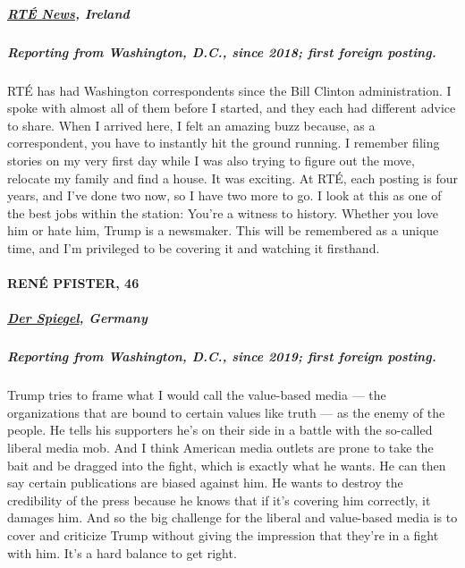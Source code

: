 \hypertarget{rtuxe9-news-ireland}{%
\subparagraph{\texorpdfstring{\textbf{\href{https://www.rte.ie/news/}{RTÉ
News}, Ireland}}{RTÉ News, Ireland}}\label{rtuxe9-news-ireland}}

\hypertarget{reporting-from-washington-dc-since-2018-first-foreign-posting-1}{%
\subparagraph{\texorpdfstring{\textbf{Reporting from Washington, D.C.,
since 2018; first foreign
posting.}}{Reporting from Washington, D.C., since 2018; first foreign posting.}}\label{reporting-from-washington-dc-since-2018-first-foreign-posting-1}}

RTÉ has had Washington correspondents since the Bill Clinton
administration. I spoke with almost all of them before I started, and
they each had different advice to share. When I arrived here, I felt an
amazing buzz because, as a correspondent, you have to instantly hit the
ground running. I remember filing stories on my very first day while I
was also trying to figure out the move, relocate my family and find a
house. It was exciting. At RTÉ, each posting is four years, and I've
done two now, so I have two more to go. I look at this as one of the
best jobs within the station: You're a witness to history. Whether you
love him or hate him, Trump is a newsmaker. This will be remembered as a
unique time, and I'm privileged to be covering it and watching it
firsthand.

\hypertarget{renuxe9-pfister-46}{%
\paragraph{RENÉ PFISTER, 46}\label{renuxe9-pfister-46}}

\hypertarget{der-spiegel-germany}{%
\subparagraph{\texorpdfstring{\textbf{\href{https://www.spiegel.de/}{Der
Spiegel}, Germany}}{Der Spiegel, Germany}}\label{der-spiegel-germany}}

\hypertarget{reporting-from-washington-dc-since-2019-first-foreign-posting-1}{%
\subparagraph{\texorpdfstring{\textbf{Reporting from Washington, D.C.,
since 2019; first foreign
posting.}}{Reporting from Washington, D.C., since 2019; first foreign posting.}}\label{reporting-from-washington-dc-since-2019-first-foreign-posting-1}}

Trump tries to frame what I would call the value-based media --- the
organizations that are bound to certain values like truth --- as the
enemy of the people. He tells his supporters he's on their side in a
battle with the so-called liberal media mob. And I think American media
outlets are prone to take the bait and be dragged into the fight, which
is exactly what he wants. He can then say certain publications are
biased against him. He wants to destroy the credibility of the press
because he knows that if it's covering him correctly, it damages him.
And so the big challenge for the liberal and value-based media is to
cover and criticize Trump without giving the impression that they're in
a fight with him. It's a hard balance to get right.

